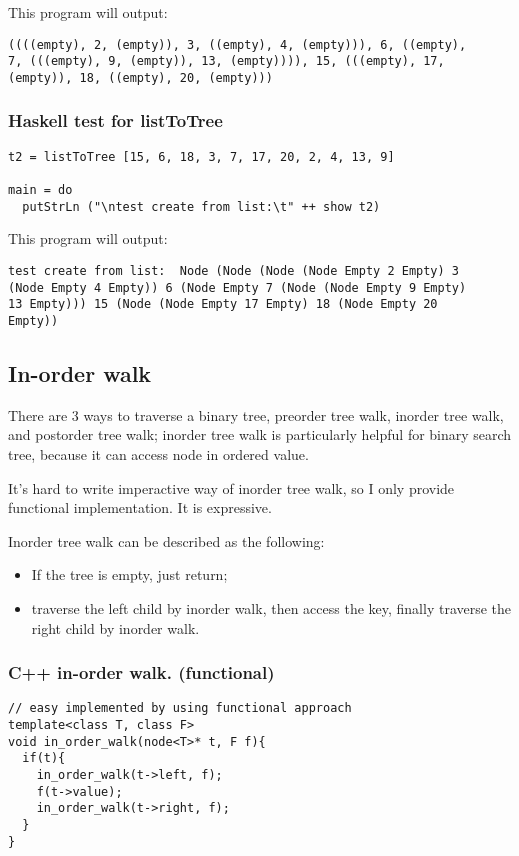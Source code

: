 \documentclass{article}
\begin{document}
This program will output:
\begin{verbatim}
((((empty), 2, (empty)), 3, ((empty), 4, (empty))), 6, ((empty), 
7, (((empty), 9, (empty)), 13, (empty)))), 15, (((empty), 17, 
(empty)), 18, ((empty), 20, (empty)))
\end{verbatim}

\subsubsection*{Haskell test for listToTree}
\lstset{language=Haskell}
\begin{lstlisting}
t2 = listToTree [15, 6, 18, 3, 7, 17, 20, 2, 4, 13, 9]

main = do
  putStrLn ("\ntest create from list:\t" ++ show t2)
\end{lstlisting}

This program will output:
\begin{verbatim}
test create from list:  Node (Node (Node (Node Empty 2 Empty) 3 
(Node Empty 4 Empty)) 6 (Node Empty 7 (Node (Node Empty 9 Empty) 
13 Empty))) 15 (Node (Node Empty 17 Empty) 18 (Node Empty 20 
Empty))
\end{verbatim}


\subsection{In-order walk}

There are 3 ways to traverse a binary tree, preorder tree walk, inorder 
tree walk, and postorder tree walk; inorder tree walk is particularly helpful
for binary search tree, because it can access node in ordered value.

It's hard to write imperactive way of inorder tree walk, so I only provide
functional implementation. It is expressive.

Inorder tree walk can be described as the following:
\begin{itemize}
\item If the tree is empty, just return;
\item traverse the left child by inorder walk, then access the key, 
finally traverse the right child by inorder walk.
\end{itemize}

\subsubsection*{C++ in-order walk. (functional)}
\lstset{language=C++}
\begin{lstlisting}
// easy implemented by using functional approach
template<class T, class F>
void in_order_walk(node<T>* t, F f){
  if(t){
    in_order_walk(t->left, f);
    f(t->value);
    in_order_walk(t->right, f);
  }
}
\end{lstlisting}
\end{document}
